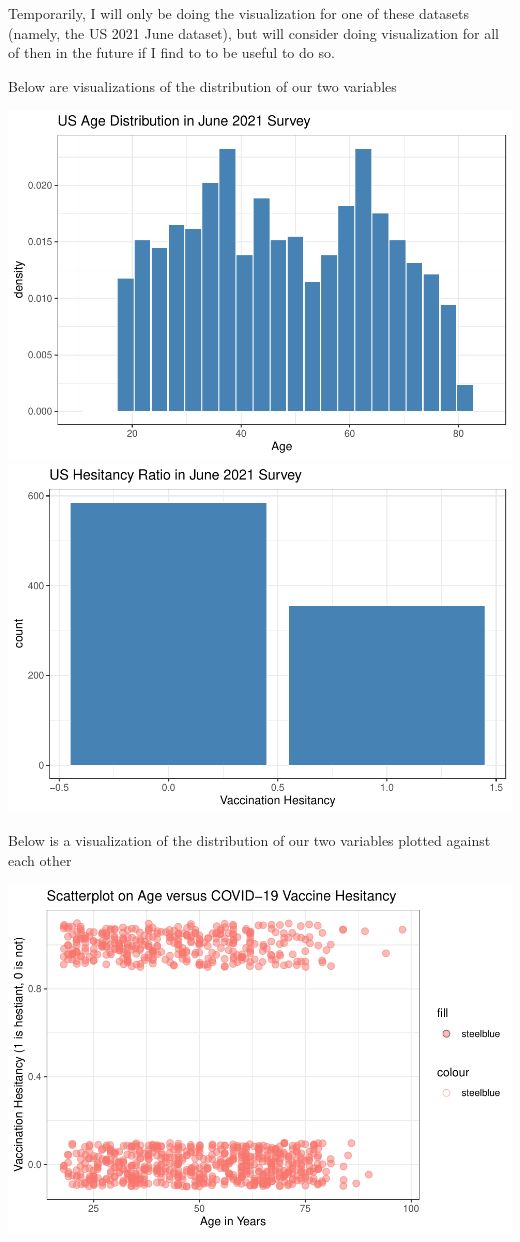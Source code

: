 \documentclass[
]{article}
\begin{document}
Temporarily, I will only be doing the visualization for one of these
datasets (namely, the US 2021 June dataset), but will consider doing
visualization for all of then in the future if I find to to be useful to
do so.

Below are visualizations of the distribution of our two variables

\includegraphics{Untitled_files/figure-latex/unnamed-chunk-3-1.pdf}
\includegraphics{Untitled_files/figure-latex/unnamed-chunk-3-2.pdf}

Below is a visualization of the distribution of our two variables
plotted against each other

\includegraphics{Untitled_files/figure-latex/unnamed-chunk-4-1.pdf}
\end{document}
